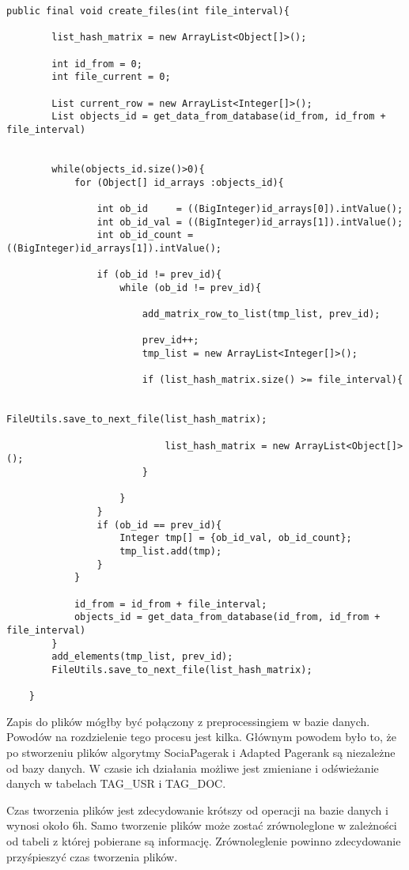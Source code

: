 \documentclass[11pt,a4paper]{report}
\begin{document}
\lstset{language=JAVA, tabsize=2}   
\begin{lstlisting}[frame=lines, caption={Tworzenie plików}, label={java_file_create}]
public final void create_files(int file_interval){
		
		list_hash_matrix = new ArrayList<Object[]>();

		int id_from = 0;
		int file_current = 0;
		
		List current_row = new ArrayList<Integer[]>(); 
		List objects_id = get_data_from_database(id_from, id_from + file_interval)


		while(objects_id.size()>0){
			for (Object[] id_arrays :objects_id){
				
				int ob_id 	  = ((BigInteger)id_arrays[0]).intValue();
				int ob_id_val = ((BigInteger)id_arrays[1]).intValue();
				int ob_id_count = ((BigInteger)id_arrays[1]).intValue();
				
				if (ob_id != prev_id){
					while (ob_id != prev_id){
						
						add_matrix_row_to_list(tmp_list, prev_id);
						
						prev_id++;
						tmp_list = new ArrayList<Integer[]>();
						
						if (list_hash_matrix.size() >= file_interval){

							FileUtils.save_to_next_file(list_hash_matrix);
							
							list_hash_matrix = new ArrayList<Object[]>();
						}
						
					}
				}
				if (ob_id == prev_id){
					Integer tmp[] = {ob_id_val, ob_id_count};
					tmp_list.add(tmp);
				}
			}

			id_from = id_from + file_interval;
			objects_id = get_data_from_database(id_from, id_from + file_interval)
		}
		add_elements(tmp_list, prev_id);
		FileUtils.save_to_next_file(list_hash_matrix);
		
	}
\end{lstlisting}

Zapis do plików mógłby być połączony z preprocessingiem w bazie danych. Powodów na rozdzielenie tego procesu jest kilka. Głównym powodem było to, że po stworzeniu plików algorytmy SociaPagerak i Adapted Pagerank są niezależne od bazy danych. W czasie ich działania możliwe jest zmieniane i odświeżanie danych w tabelach TAG\_USR i TAG\_DOC. 

Czas tworzenia plików jest zdecydowanie krótszy od operacji na bazie danych i wynosi około 6h. Samo tworzenie plików może zostać zrównoleglone w zależności od tabeli z której pobierane są informację. Zrównoleglenie powinno zdecydowanie przyśpieszyć czas tworzenia plików. 
\end{document}
